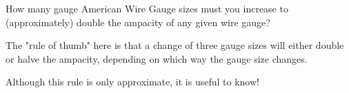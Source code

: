 

How many gauge American Wire Gauge sizes must you increase to (approximately) double the ampacity of any given wire gauge?







The "rule of thumb" here is that a change of three gauge sizes will either double or halve the ampacity, depending on which way the gauge size changes.







Although this rule is only approximate, it is useful to know!




